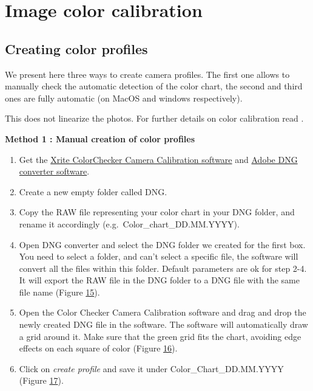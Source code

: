 \documentclass[
]{book}
\theoremstyle{definition}
\theoremstyle{definition}
\theoremstyle{definition}
\theoremstyle{definition}
\theoremstyle{remark}
\begin{document}
\hypertarget{image-color-calibration}{%
\section{Image color calibration}\label{image-color-calibration}}

\hypertarget{creating-color-profiles}{%
\subsection{Creating color profiles}\label{creating-color-profiles}}

We present here three ways to create camera profiles. The first one
allows to manually check the automatic detection of the color chart, the
second and third ones are fully automatic (on MacOS and windows
respectively).

This does not linearize the photos. For further details on color
calibration read \citep{troscianko2015image}.

\textbf{Method 1 : Manual creation of color profiles}

\begin{enumerate}
\def\labelenumi{\arabic{enumi}.}
\item
  Get the \href{https://xritephoto.com/ph_product_overview.aspx?ID=938\&Action=Support\&SoftwareID=2030}{Xrite ColorChecker Camera Calibration
  software}
  and \href{https://helpx.adobe.com/photoshop/using/adobe-dng-converter.html}{Adobe DNG converter
  software}.
\item
  Create a new empty folder called DNG.
\item
  Copy the RAW file representing your color chart in your DNG folder,
  and rename it accordingly (e.g.~Color\_chart\_DD.MM.YYYY).
\item
  Open DNG converter and select the DNG folder we created for the
  first box. You need to select a folder, and can't select a specific
  file, the software will convert all the files within this folder.
  Default parameters are ok for step 2-4. It will export the RAW file
  in the DNG folder to a DNG file with the same file name (Figure
  \protect\hyperlink{adobe_dng}{15}).
\item
  Open the Color Checker Camera Calibration software and drag and drop
  the newly created DNG file in the software. The software will
  automatically draw a grid around it. Make sure that the green grid
  fits the chart, avoiding edge effects on each square of color
  (Figure \protect\hyperlink{color_checker_camera_calibration}{16}).
\item
  Click on \emph{create profile} and save it under Color\_Chart\_DD.MM.YYYY
  (Figure \protect\hyperlink{color_checker_profile}{17}).
\end{enumerate}
\end{document}
